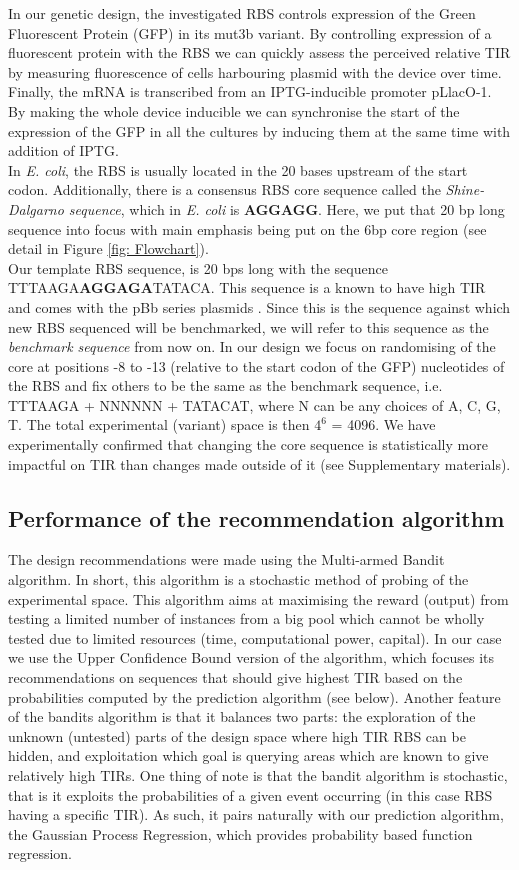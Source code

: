 \documentclass{article}
\begin{document}
In our genetic design, the investigated RBS controls expression of the Green Fluorescent Protein (GFP) in its mut3b variant. 
By controlling expression of a fluorescent protein with the RBS we can quickly assess the perceived relative TIR by measuring fluorescence of cells harbouring plasmid with the device over time.
Finally, the mRNA is transcribed from an IPTG-inducible promoter pLlacO-1. 
By making the whole device inducible we can synchronise the start of the expression of the GFP in all the cultures by inducing them at the same time with addition of IPTG.\\
In \emph{E. coli}, the RBS is usually located in the 20 bases upstream of the start codon. 
Additionally, there is a consensus RBS core sequence called the \textit{Shine-Dalgarno sequence}, which in \emph{E. coli} is \textbf{AGGAGG}. 
Here, we put that 20 bp long sequence into focus with main emphasis being put on the 6bp core region
(see detail in Figure \ref{fig: Flowchart}).\\
Our template RBS sequence, is 20 bps long with the sequence TTTAAGA\textbf{AGGAGA}TATACA.
This sequence is a known to have high TIR and comes with the pBb series plasmids \cite{Lee2011}. 
Since this is the sequence against which new RBS sequenced will be benchmarked,
we will refer to this sequence as the \textit{benchmark sequence} from now on.
In our design we focus on randomising of the core at positions -8 to -13 (relative to the start codon of the GFP) nucleotides of the RBS and fix others to be the same as the benchmark sequence, i.e. TTTAAGA + NNNNNN + TATACAT, where N can be any choices of A, C, G, T. 
The total experimental (variant) space is then $4^6$ = 4096.
We have experimentally confirmed that changing the core sequence is statistically more impactful on TIR than changes made outside of it (see Supplementary materials).

\subsection{Performance of the recommendation algorithm}
 
The design recommendations were made using the Multi-armed Bandit algorithm.
In short, this algorithm is a stochastic method of probing of the experimental space. 
This algorithm aims at maximising the reward (output) from testing a limited number of instances from a big pool which cannot be wholly tested due to limited resources (time, computational power, capital). 
In our case we use the Upper Confidence Bound version of the algorithm, which focuses its recommendations on sequences that should give highest TIR based on the probabilities computed by the prediction algorithm (see below). 
Another feature of the bandits algorithm is that it balances two parts: the exploration of the unknown (untested) parts of the design space where high TIR RBS can be hidden, and exploitation which goal is querying areas which are known to give relatively high TIRs.
One thing of note is that the bandit algorithm is stochastic, that is it exploits the probabilities of a given event occurring (in this case RBS having a specific TIR). 
As such, it pairs naturally with our prediction algorithm, the Gaussian Process Regression, which provides probability based function regression.
\end{document}
